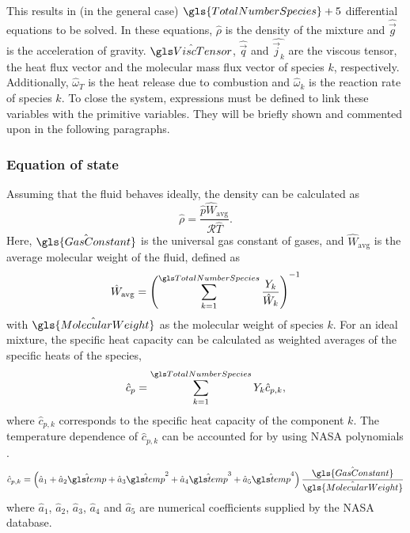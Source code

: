 This results in (in the general case) $\gls{TotalNumberSpecies} + 5$ differential equations to be solved. In these equations, $\hat \rho$ is the density of the mixture and $\hat{\vec{g}}$ is the acceleration of gravity. $\glsHat{ViscTensor}$, $\hat{\vec{q}}$ and $\hat{\vec{j}_k}$ are the viscous tensor, the heat flux vector and the molecular mass flux vector of species $k$, respectively. Additionally, $\hat \omega_T$ is the heat release due to combustion and $\hat \omega_k$ is the reaction rate of species $k$. To close the system, expressions must be defined to link these variables with the primitive variables. They will be briefly shown and commented upon in the following paragraphs.
\subsubsection{Equation of state}
Assuming that the fluid behaves ideally, the density can be calculated as
\begin{equation}
\hat \rho = \frac{\hat{p}  \hat{W}_{\text{avg}}}{\mathcal{R} \hat{T} }. \label{eq:IdealGassDimensional}
\end{equation}
Here, $\hat{\gls{GasConstant}}$ is the universal gas constant of gases, and $\hat W_{\text{avg}}$ is the average molecular weight of the fluid, defined as
\begin{equation}
\hat W_{\text{avg}} = \left( \SumOvAllns \frac{Y_k}{\hat W_k} \right)^{-1}
\end{equation}
with $\hat{\gls{MolecularWeight}}$ as the molecular weight of species $k$.  For an ideal mixture, the specific heat capacity can be calculated as weighted averages of the specific heats of the species, 
\begin{equation}
\hat c_p = \SumOvAllns Y_k \hat{c}_{p,k},%
\end{equation}
where $\hat{c}_{p,k}$ corresponds to the specific heat capacity of the component $k$. The temperature dependence of $\hat{c}_{p,k}$ can be accounted for by using NASA polynomials \citep{mcbrideNASAThermodynamicData1993}.
\begin{equation}
\hat{c}_{p,k} = \left(\hat a_1 + \hat  a_2\glsHat{temp} +\hat  a_3\glsHat{temp}^2 +\hat  a_4\glsHat{temp}^3+\hat a_5\glsHat{temp}^4\right)\frac{\hat{\gls{GasConstant}}}{\hat{\gls{MolecularWeight}}}
\end{equation}
where $\hat a_1$, $\hat a_2$, $\hat a_3$, $\hat a_4$ and $\hat a_5$ are numerical coefficients supplied by the NASA database.
